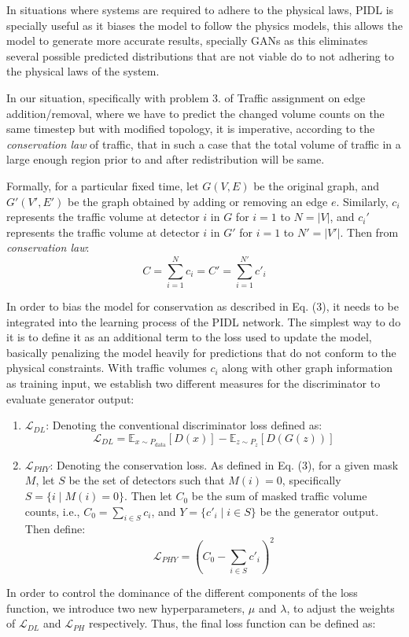 \documentclass[conference]{IEEEtran}
\begin{document}
In situations where systems are required to adhere to the physical laws, PIDL is specially useful as it biases the model to follow the physics models, this allows the model to generate more accurate results, specially GANs as this eliminates several possible predicted distributions that are not viable do to not adhering to the physical laws of the system.

In our situation, specifically with problem 3. of Traffic assignment on edge addition/removal, where we have to predict the changed volume counts on the same timestep but with modified topology, it is imperative, according to the \textit{conservation law} of traffic, that in such a case that the total volume of traffic in a large enough region prior to and after redistribution will be same.

Formally, for a particular fixed time, let \( G(V,E) \) be the original graph, and \( G'(V',E') \) be the graph obtained by adding or removing an edge \( e \). Similarly, \( c_i \) represents the traffic volume at detector \( i \) in \( G \) for \( i = 1 \) to \( N = |V| \), and \( c_i' \) represents the traffic volume at detector \( i \) in \( G' \) for \( i = 1 \) to \( N' = |V'| \). Then from \textit{conservation law}:
\begin{equation}
    C = \sum_{i=1}^{N} c_i = C' = \sum_{i=1}^{N'} c'_i \tag{5}
\end{equation}

In order to bias the model for conservation as described in Eq. (3), it needs to be integrated into the learning process of the PIDL network. The simplest way to do it is to define it as an additional term to the loss used to update the model, basically penalizing the model heavily for predictions that do not conform to the physical constraints. With traffic volumes \(c_i\) along with other graph information as training input, we establish two different measures for the discriminator to evaluate generator output:
\begin{enumerate}
    \item \textbf{\( \mathcal{L}_{DL} \)}: Denoting the conventional discriminator loss defined as:
    \[ \mathcal{L}_{DL} = \mathbb{E}_{x \sim P_{\text{data}}}[D(x)] - \mathbb{E}_{z \sim P_z}[D(G(z))] \]

    \item \textbf{\( \mathcal{L}_{PHY} \)}: Denoting the conservation loss. As defined in Eq. (3), for a given mask \( M \), let \( S \) be the set of detectors such that \( M(i) = 0 \), specifically \( S = \{i \mid M(i) = 0\} \). Then let \( C_0 \) be the sum of masked traffic volume counts, i.e., \( C_0 = \sum_{i \in S} c_i \), and \( Y = \{c'_i \mid i \in S\} \) be the generator output. Then define:
    \[ \mathcal{L}_{PHY} = (C_0 - \sum_{i \in S} c'_i)^2 \]
\end{enumerate}
In order to control the dominance of the different components of the loss function, we introduce two new hyperparameters, \( \mu \) and \( \lambda \), to adjust the weights of \( \mathcal{L}_{DL} \) and \( \mathcal{L}_{PH} \) respectively. Thus, the final loss function can be defined as:
\end{document}
